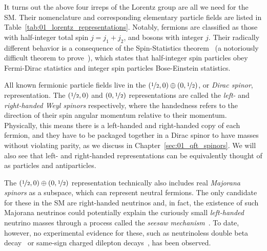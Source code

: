 It turns out the above four irreps of the Lorentz group are all we need for the SM.
Their nomenclature and corresponding elementary particle fields are listed in Table~\ref{tab:01_lorentz_representations}.
Notably, fermions are classified as those with half-integer total spin $j = j_1 + j_2$, and bosons with integer $j$.
Their radically different behavior is a consequence of the Spin-Statistics theorem~\cite{PhysRev.110.1450} (a notoriously difficult theorem to prove~\cite{FeynmanVol3}), which states that half-integer spin particles obey Fermi-Dirac statistics and integer spin particles Bose-Einstein statistics.

All known fermionic particle fields live in the $(\nicefrac{1}{2}, 0) \oplus (0, \nicefrac{1}{2})$, or \textit{Dirac spinor}, representation.
The $(\nicefrac{1}{2}, 0)$ and $(0, \nicefrac{1}{2})$ representations are called the \textit{left-} and \textit{right-handed Weyl spinors} respectively, where the handedness refers to the direction of their spin angular momentum relative to their momentum.
Physically, this means there is a left-handed and right-handed copy of each fermion, and they have to be packaged together in a Dirac spinor to have masses without violating parity, as we discuss in Chapter~\ref{sec:01_qft_spinors}.
We will also see that left- and right-handed representations can be equivalently thought of as particles and antiparticles.

The $(\nicefrac{1}{2}, 0) \oplus (0, \nicefrac{1}{2})$ representation technically also includes real \textit{Majorana spinors} as a subspace, which can represent neutral fermions.
The only candidate for these in the SM are right-handed neutrinos and, in fact, the existence of such Majorana neutrinos could potentially explain the curiously small \textit{left-handed} neutrino masses through a process called the \textit{seesaw mechanism}~\cite{Foot:1988aq, Schechter:1980gr}.
To date, however, no experimental evidence for these, such as neutrinoless double beta decay~\cite{Rodejohann:2011mu} or same-sign charged dilepton decays~\cite{CMS:2018jxx}, has been observed.

